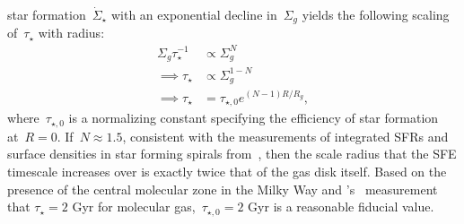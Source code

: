 star formation~$\dot{\Sigma}_\star$ with an exponential decline in~$\Sigma_g$
yields the following scaling of~$\tau_\star$ with radius:
\begin{equation}\begin{split}
\Sigma_g \tau_\star^{-1} &\propto \Sigma_g^N
\\
\implies \tau_\star &\propto \Sigma_g^{1 - N}
\\
\implies \tau_\star &= \tau_{\star,0} e^{(N - 1) R / R_g},
\end{split}\end{equation}
where~$\tau_{\star,0}$ is a normalizing constant specifying the efficiency of
star formation at~$R = 0$.
If~$N \approx 1.5$, consistent with the measurements of integrated SFRs and
surface densities in star forming spirals from~\citet{Kennicutt1998}, then
the scale radius that the SFE timescale increases over is exactly twice that
of the gas disk itself.
Based on the presence of the central molecular zone in the Milky Way
\citep[e.g.,][]{Morris1996, Dahmen1998, PiercePrice2000, Hatchfield2020} and
\citeauthor{Leroy2008}'s~\citeyearpar{Leroy2008} measurement that
$\tau_\star = 2$ Gyr for molecular gas,~$\tau_{\star,0} = 2$ Gyr is a
reasonable fiducial value.

